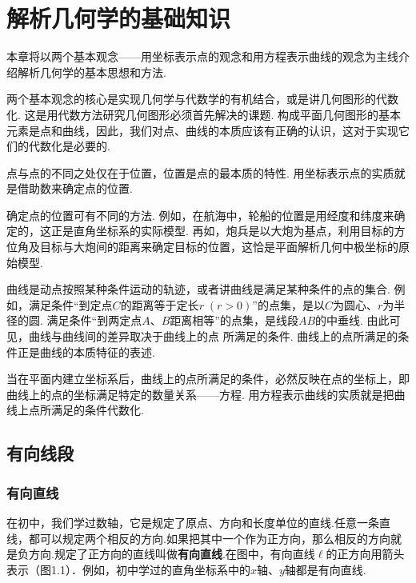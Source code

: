 \chapter{解析几何学的基础知识}
本章将以两个基本观念——用坐标表示点的观念和用方程表示曲线的观念为主线介绍解析几何学的基本思想和方法. 

两个基本观念的核心是实现几何学与代数学的有机结合，或是讲几何图形的代数化. 这是用代数方法研究几何图形必须首先解决的课题. 构成平面几何图形的基本元素是点和曲线，因此，我们对点、曲线的本质应该有正确的认识，这对于实现它们的代数化是必要的. 

点与点的不同之处仅在于位置，位置是点的最本质的特性. 用坐标表示点的实质就是借助数来确定点的位置. 

确定点的位置可有不同的方法. 例如，在航海中，轮船的位置是用经度和纬度来确定的，这正是直角坐标系的实际模型. 再如，炮兵是以大炮为基点，利用目标的方位角及目标与大炮间的距离来确定目标的位置，这恰是平面解析几何中极坐标的原始模型. 

曲线是动点按照某种条件运动的轨迹，或者讲曲线是满足某种条件的点的集合. 例如，满足条件“到定点$C$的距离等于定长$r\;(r>0)$”的点集，是以$C$为圆心、$r$为半径的圆. 满足条件“到两定点$A$、$B$距离相等”的点集，是线段$AB$的中垂线. 由此可见，曲线与曲线间的差异取决于曲线上的点
所满足的条件. 曲线上的点所满足的条件正是曲线的本质特征的表述.

当在平面内建立坐标系后，曲线上的点所满足的条件，必然反映在点的坐标上，即曲线上的点的坐标满足特定的数量关系——方程. 用方程表示曲线的实质就是把曲线上点所满足的条件代数化.

\section{有向线段}
\subsection{有向直线}
在初中，我们学过数轴，它是规定了原点、方向和长度单位的直线.任意一条直线，都可以规定两个相反的方向.如果把其中一个作为正方向，那么相反的方向就是负方向.规定了正方向的直线叫做\textbf{有向直线}.在图中，有向直线$\ell$的正方向用箭头表示（图1.1）．例如，初中学过的直角坐标系中的$x$轴、$y$轴都是有向直线.

\noindent
\begin{minipage}{.45\textwidth}
\centering
{}    
\end{minipage}\hfill
\begin{minipage}{.45\textwidth}
\centering
{}    
\end{minipage}

